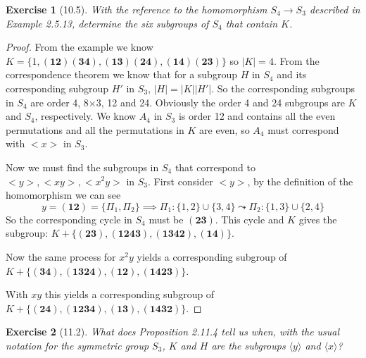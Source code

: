\documentclass[12pt]{article}
\newtheorem*{exer}{Exercise}
\newcommand{\cycle}[1]{(\mathbf{#1})}
\begin{document}
\begin{exer}[10.5]
With the reference to the homomorphism $S_4 \rightarrow S_3$ described
in Example 2.5.13, determine the six subgroups of $S_4$ that contain
$K$.
\end{exer}

\begin{proof}

    From the example we know $K = \{ 1, \cycle{12} \cycle{34},
    \cycle{13}\cycle{24}, \cycle{14}\cycle{23}\}$ so $|K| = 4$. From
    the correspondence theorem we know that for a subgroup $H$ in $S_4$
    and its corresponding subgroup $H'$ in $S_3$, $|H| = |K||H'|$. So
    the corresponding subgroups in $S_4$ are order 4, 8$\times$3, 12 and
    24. Obviously the order 4 and 24 subgroups are $K$ and $S_4$,
    respectively. We know $A_4$ in $S_3$ is order 12 and contains all
    the even permutations and all the permutations in $K$ are even, so
    $A_4$ must correspond with $<x>$ in $S_3$.
    
    Now we must find the subgroups in $S_4$ that correspond to $<y>,
    <xy>, <x^2y>$ in $S_3$. First consider $<y>$, by the definition of
    the homomorphism we can see \[ y = \cycle{12} = \{\Pi_1, \Pi_2\}
        \implies \Pi_1 : \{1,2\}\cup\{3,4\} \leadsto \Pi_2:
    \{1,3\}\cup\{2,4\} \] So the corresponding cycle in $S_4$ must be
    $\cycle{23}$. This cycle and $K$ gives the subgroup:  $K +
    \{\cycle{23}, \cycle{1243}, \cycle{1342}, \cycle{14} \}$.

    Now the same process for $x^2y$ yields a corresponding subgroup of $K +
    \{\cycle{34}, \cycle{1324}, \cycle{12}, \cycle{1423}\}$.

    With $xy$ this yields a corresponding subgroup of $K + \{\cycle{24},
    \cycle{1234}, \cycle{13}, \cycle{1432}\}$.

\end{proof}


\begin{exer}[11.2]
What does Proposition 2.11.4 tell us when, with the usual notation for
the symmetric group $S_3$, $K$ and $H$ are the subgroups $\langle y
\rangle$ and $\langle x \rangle$?
\end{exer}
\end{document}
